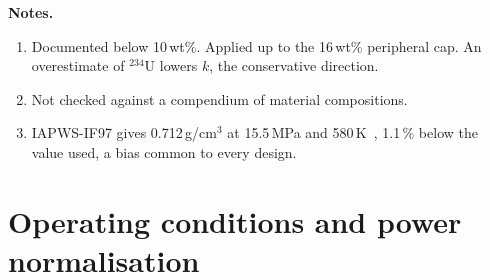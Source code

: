 \setlength{\tabcolsep}{6pt}
\normalsize

\noindent \textbf{Notes.}
\begin{enumerate}[label=(\alph*), nosep]
  \item Documented below 10\,wt\%. Applied up to the 16\,wt\% peripheral cap. An overestimate of $^{234}$U lowers $k$, the conservative direction.
  \item Not checked against a compendium of material compositions.
  \item IAPWS-IF97 gives 0.712\,g/cm$^3$ at 15.5\,MPa and 580\,K~\cite{wagner_iapws_if97_2000}, 1.1\,\% below the value used, a bias common to every design.
\end{enumerate}

\section{Operating conditions and power normalisation}
\label{app:inputs-operating}

